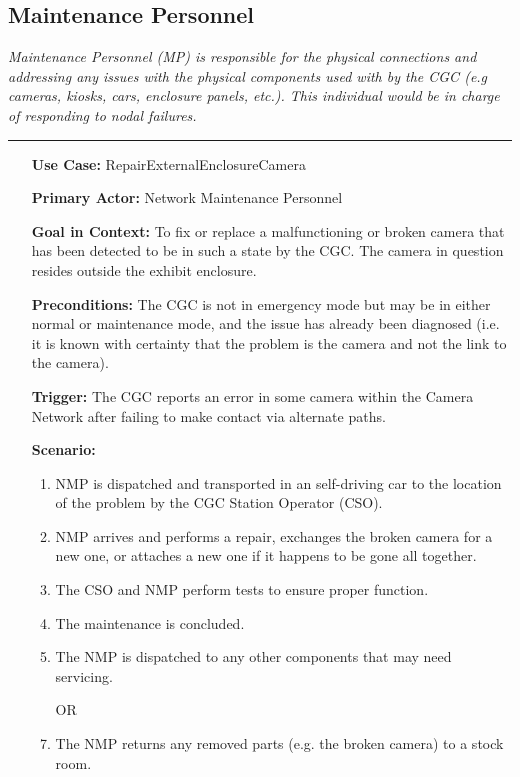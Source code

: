 \documentclass[12pt]{article}
\begin{document}
    \subsection{Maintenance Personnel}
    \textit{Maintenance Personnel (MP) is responsible for the physical connections 
    and addressing any issues with the physical components used with by the CGC (e.g cameras, 
    kiosks, cars, enclosure panels, etc.). This individual would be in charge of responding to nodal failures.}
    \par\noindent\rule{\textwidth}{0.4pt}    
    \begin{itemize}
        \item[]\textbf{Use Case:}                                
            RepairExternalEnclosureCamera

        \item[]\textbf{Primary Actor:}
            Network Maintenance Personnel

        \item[]\textbf{Goal in Context:}
            To fix or replace a malfunctioning or broken camera that has been detected to
            be in such a state by the CGC. The camera in question resides outside the exhibit
            enclosure.

        \item[]\textbf{Preconditions:}
            The CGC is not in emergency mode but may be in either normal or maintenance mode, and
            the issue has already been diagnosed (i.e. it is known with certainty that the problem
            is the camera and not the link to the camera).

        \item[]\textbf{Trigger:}
            The CGC reports an error in some camera within the Camera Network after 
            failing to make contact via alternate paths.

        \item[]\textbf{Scenario:}
            \begin{enumerate}
                \item NMP is dispatched and transported in an self-driving car to the 
                location of the problem by the CGC Station Operator (CSO).
                \item NMP arrives and performs a repair, exchanges the broken camera
                for a new one, or attaches a new one if it happens to be gone all together.
                \item The CSO and NMP perform tests to ensure proper function.
                \item The maintenance is concluded.
                \item The NMP is dispatched to any other components that may need servicing.
                \item [OR]
                \item The NMP returns any removed parts (e.g. the broken camera) to a stock room.
            \end{enumerate}


\end{itemize}
\end{document}
